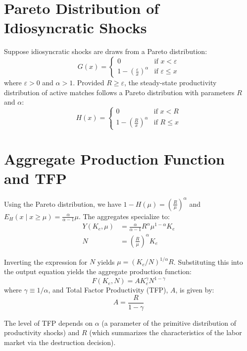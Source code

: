 \documentclass[11pt]{article}
\begin{document}
\section{Pareto Distribution of Idiosyncratic Shocks}
Suppose idiosyncratic shocks are draws from a Pareto distribution:
\begin{equation}
G(x) = 
\begin{cases} 
0 & \text{if } x < \varepsilon \\ 
1 - \left(\frac{\varepsilon}{x}\right)^\alpha & \text{if } \varepsilon \le x 
\end{cases}
\end{equation}
where $\varepsilon > 0$ and $\alpha > 1$. Provided $R \ge \varepsilon$, the steady-state productivity distribution of active matches follows a Pareto distribution with parameters $R$ and $\alpha$:
\begin{equation}
H(x) = 
\begin{cases} 
0 & \text{if } x < R \\ 
1 - \left(\frac{R}{x}\right)^\alpha & \text{if } R \le x 
\end{cases}
\end{equation}

\section{Aggregate Production Function and TFP}
Using the Pareto distribution, we have $1 - H(\mu) = (\frac{R}{\mu})^\alpha$ and $E_H(x \mid x \ge \mu) = \frac{\alpha}{\alpha-1} \mu$. The aggregates specialize to:
\begin{align}
Y(K_e, \mu) &= \frac{\alpha}{\alpha-1} R^\alpha \mu^{1-\alpha} K_e \\
N &= \left(\frac{R}{\mu}\right)^\alpha K_e
\end{align}

Inverting the expression for $N$ yields $\mu = (K_e/N)^{1/\alpha} R$. Substituting this into the output equation yields the aggregate production function:
\begin{equation}
F(K_e, N) = A K_e^\gamma N^{1-\gamma}
\end{equation}
where $\gamma \equiv 1/\alpha$, and Total Factor Productivity (TFP), $A$, is given by:
\begin{equation}
A = \frac{R}{1-\gamma}
\end{equation}

The level of TFP depends on $\alpha$ (a parameter of the primitive distribution of productivity shocks) and $R$ (which summarizes the characteristics of the labor market via the destruction decision).
\end{document}

